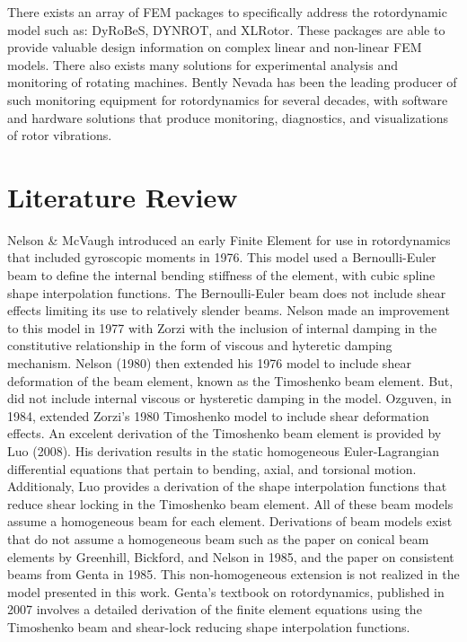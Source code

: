 There exists an array of FEM packages to specifically address the rotordynamic model such as: DyRoBeS, DYNROT, and XLRotor. These packages are able to provide valuable design information on complex linear and non-linear FEM models. There also exists many solutions for experimental analysis and monitoring of rotating machines. Bently Nevada has been the leading producer of such monitoring equipment for rotordynamics for several decades, with software and hardware solutions that produce monitoring, diagnostics, and visualizations of rotor vibrations.\par
\section{Literature Review}
Nelson \& McVaugh \cite{nelson1976dynamics} introduced an early Finite Element for use in rotordynamics that included gyroscopic moments in 1976. This model used a Bernoulli-Euler beam to define the internal bending stiffness of the element, with cubic spline shape interpolation functions. The Bernoulli-Euler beam does not include shear effects limiting its use to relatively slender beams. Nelson made an improvement to this model in 1977 with Zorzi \cite{zorzi1977finite} with the inclusion of internal damping in the constitutive relationship in the form of viscous and hyteretic damping mechanism. Nelson (1980)\cite{nelson1980finite} then extended his 1976 model to include shear deformation of the beam element, known as the Timoshenko beam element. But, did not include internal viscous or hysteretic damping in the model. Ozguven, in 1984\cite{ozguven1984whirl}, extended Zorzi's 1980 Timoshenko model to include shear deformation effects.  An excelent derivation of the Timoshenko beam element is provided by Luo (2008)\cite{luo2008efficient}. His derivation results in the static homogeneous Euler-Lagrangian differential equations that pertain to bending, axial, and torsional motion. Additionaly, Luo provides a derivation of the shape interpolation functions that reduce shear locking in the Timoshenko beam element. All of these beam models assume a homogeneous beam for each element. Derivations of beam models exist that do not assume a homogeneous beam such as the paper on conical beam elements by Greenhill, Bickford, and Nelson in 1985\cite{greenhill1985conical}, and the paper on consistent beams from Genta in 1985\cite{genta1985consistent}. This non-homogeneous extension is not realized in the model presented in this work. Genta's textbook on rotordynamics, published in 2007\cite{genta2007dynamics} involves a detailed derivation of the finite element equations using the Timoshenko beam and shear-lock reducing shape interpolation functions.\par 

